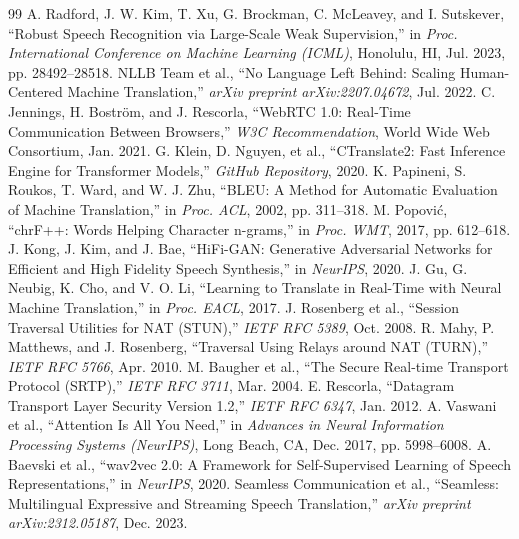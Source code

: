 \documentclass[12pt,a4paper]{report}
\begin{document}
\newpage
\begin{thebibliography}{99}
 A. Radford, J. W. Kim, T. Xu, G. Brockman, C. McLeavey, and I. Sutskever, ``Robust Speech Recognition via Large-Scale Weak Supervision,'' in \textit{Proc. International Conference on Machine Learning (ICML)}, Honolulu, HI, Jul. 2023, pp. 28492--28518.
 NLLB Team et al., ``No Language Left Behind: Scaling Human-Centered Machine Translation,'' \textit{arXiv preprint arXiv:2207.04672}, Jul. 2022.
 C. Jennings, H. Bostr\"om, and J. Rescorla, ``WebRTC 1.0: Real-Time Communication Between Browsers,'' \textit{W3C Recommendation}, World Wide Web Consortium, Jan. 2021.
 G. Klein, D. Nguyen, et al., ``CTranslate2: Fast Inference Engine for Transformer Models,'' \textit{GitHub Repository}, 2020.
 K. Papineni, S. Roukos, T. Ward, and W. J. Zhu, ``BLEU: A Method for Automatic Evaluation of Machine Translation,'' in \textit{Proc. ACL}, 2002, pp. 311--318.
 M. Popovi\'c, ``chrF++: Words Helping Character n-grams,'' in \textit{Proc. WMT}, 2017, pp. 612--618.
 J. Kong, J. Kim, and J. Bae, ``HiFi-GAN: Generative Adversarial Networks for Efficient and High Fidelity Speech Synthesis,'' in \textit{NeurIPS}, 2020.
 J. Gu, G. Neubig, K. Cho, and V. O. Li, ``Learning to Translate in Real-Time with Neural Machine Translation,'' in \textit{Proc. EACL}, 2017.
 J. Rosenberg et al., ``Session Traversal Utilities for NAT (STUN),'' \textit{IETF RFC 5389}, Oct. 2008.
 R. Mahy, P. Matthews, and J. Rosenberg, ``Traversal Using Relays around NAT (TURN),'' \textit{IETF RFC 5766}, Apr. 2010.
 M. Baugher et al., ``The Secure Real-time Transport Protocol (SRTP),'' \textit{IETF RFC 3711}, Mar. 2004.
 E. Rescorla, ``Datagram Transport Layer Security Version 1.2,'' \textit{IETF RFC 6347}, Jan. 2012.
 A. Vaswani et al., ``Attention Is All You Need,'' in \textit{Advances in Neural Information Processing Systems (NeurIPS)}, Long Beach, CA, Dec. 2017, pp. 5998--6008.
 A. Baevski et al., ``wav2vec 2.0: A Framework for Self-Supervised Learning of Speech Representations,'' in \textit{NeurIPS}, 2020.
 Seamless Communication et al., ``Seamless: Multilingual Expressive and Streaming Speech Translation,'' \textit{arXiv preprint arXiv:2312.05187}, Dec. 2023.

\end{thebibliography}
\end{document}
